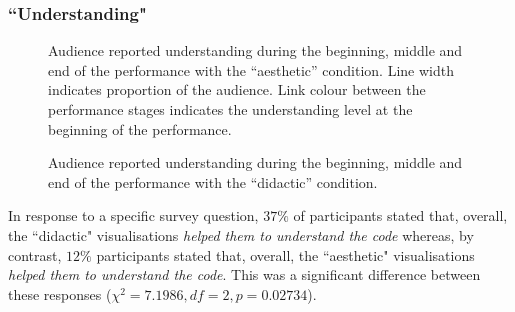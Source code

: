 \documentclass{sig-alternate}
\begin{document}
\subsubsection{``Understanding"}

\begin{figure}
\centering
{}
\caption{Audience reported understanding during the beginning, middle and end of the performance with the ``aesthetic'' condition. Line width indicates proportion of the audience. Link colour between the performance stages indicates the understanding level at the beginning of the performance.}
\label{fig:aesthetic-understanding}
\end{figure}

\begin{figure}
\centering
{}
\caption{Audience reported understanding during the beginning, middle and end of the performance with the ``didactic'' condition.}
\label{fig:didactic-understanding}
\end{figure}

In response to a specific survey question, $37\%$ of participants stated that, overall, the ``didactic" visualisations {\it helped them to understand the code} whereas, by contrast, $12\%$ participants stated that, overall, the ``aesthetic" visualisations {\it helped them to understand the code}. This was a significant difference between these responses ($\chi^2=7.1986,df=2,p=0.02734$).
\end{document}
